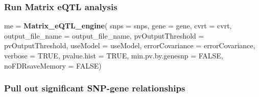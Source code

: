 \documentclass[]{article}
\newenvironment{Shaded}{\begin{snugshade}}{\end{snugshade}}
\newcommand{\KeywordTok}[1]{\textcolor[rgb]{0.13,0.29,0.53}{\textbf{#1}}}
\newcommand{\DataTypeTok}[1]{\textcolor[rgb]{0.13,0.29,0.53}{#1}}
\newcommand{\FloatTok}[1]{\textcolor[rgb]{0.00,0.00,0.81}{#1}}
\newcommand{\CharTok}[1]{\textcolor[rgb]{0.31,0.60,0.02}{#1}}
\newcommand{\StringTok}[1]{\textcolor[rgb]{0.31,0.60,0.02}{#1}}
\newcommand{\CommentTok}[1]{\textcolor[rgb]{0.56,0.35,0.01}{\textit{#1}}}
\newcommand{\OtherTok}[1]{\textcolor[rgb]{0.56,0.35,0.01}{#1}}
\newcommand{\OperatorTok}[1]{\textcolor[rgb]{0.81,0.36,0.00}{\textbf{#1}}}
\newcommand{\NormalTok}[1]{#1}
\begin{document}
\subsubsection{Run Matrix eQTL analysis}\label{run-matrix-eqtl-analysis}

\begin{Shaded}
\begin{Highlighting}[]
\NormalTok{ me =}\StringTok{ }\KeywordTok{Matrix_eQTL_engine}\NormalTok{(}
    \DataTypeTok{snps =}\NormalTok{ snps,}
    \DataTypeTok{gene =}\NormalTok{ gene,}
    \DataTypeTok{cvrt =}\NormalTok{ cvrt,}
    \DataTypeTok{output_file_name =}\NormalTok{ output_file_name,}
    \DataTypeTok{pvOutputThreshold =}\NormalTok{ pvOutputThreshold,}
    \DataTypeTok{useModel =}\NormalTok{ useModel, }
    \DataTypeTok{errorCovariance =}\NormalTok{ errorCovariance, }
    \DataTypeTok{verbose =} \OtherTok{TRUE}\NormalTok{,}
    \DataTypeTok{pvalue.hist =} \OtherTok{TRUE}\NormalTok{,}
    \DataTypeTok{min.pv.by.genesnp =} \OtherTok{FALSE}\NormalTok{,}
    \DataTypeTok{noFDRsaveMemory =} \OtherTok{FALSE}\NormalTok{)}
\end{Highlighting}
\end{Shaded}

\subsubsection{Pull out significant SNP-gene
relationships}\label{pull-out-significant-snp-gene-relationships}

\begin{Shaded}
\end{Shaded}
\end{document}
